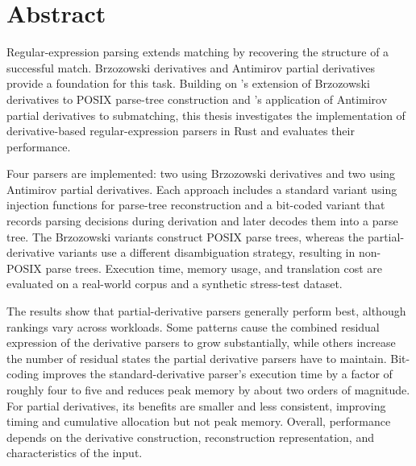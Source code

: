 \chapter*{Abstract}

Regular-expression parsing extends matching by
recovering the structure of a successful match.
Brzozowski derivatives and Antimirov partial
derivatives provide a foundation for this task.
Building on \citet{sulzmannlu2014}'s extension 
of Brzozowski derivatives to POSIX parse-tree construction 
and \citet{sulzmannlu2012}'s application 
of Antimirov partial derivatives to submatching,
this thesis investigates the implementation
of derivative-based regular-expression parsers
in Rust and evaluates their performance.

Four parsers are implemented:
two using Brzozowski derivatives and
two using Antimirov partial derivatives.
Each approach includes a standard variant using
injection functions for parse-tree reconstruction
and a bit-coded variant that records parsing decisions 
during derivation and later decodes them into a parse tree.
The Brzozowski variants construct POSIX parse trees,
whereas the partial-derivative variants use a
different disambiguation strategy, resulting in non-POSIX parse trees.
Execution time, memory usage, and translation cost
are evaluated on a real-world corpus and
a synthetic stress-test dataset.

The results show that partial-derivative parsers
generally perform best, although rankings vary across workloads.
Some patterns cause the combined residual expression
of the derivative parsers to grow substantially,
while others increase the number of residual states 
the partial derivative parsers have to maintain.
Bit-coding improves the standard-derivative parser's
execution time by a factor of roughly four to five
and reduces peak memory by about two orders of magnitude.
For partial derivatives, its benefits are smaller and less consistent, 
improving timing and cumulative allocation but not peak memory.
Overall, performance depends on the derivative
construction, reconstruction representation,
and characteristics of the input.

